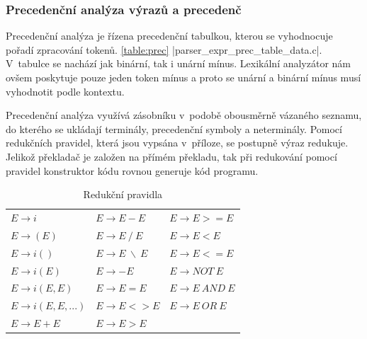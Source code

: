 \subsubsection{Precedenční analýza výrazů a precedenč}

Precedenční analýza je řízena precedenční tabulkou, kterou se vyhodnocuje pořadí zpracování tokenů. \ref{table:prec}
\ic|parser_expr_prec_table_data.c|. V~tabulce se nachází jak binární, tak i unární mínus.
Lexikální analyzátor nám ovšem poskytuje pouze jeden token mínus a proto se unární a binární mínus
musí vyhodnotit podle kontextu.

Precedenční analýza využívá zásobníku v~podobě obousměrně vázaného seznamu, do kterého se ukládají terminály,
precedenční symboly a neterminály. Pomocí redukčních pravidel, která jsou vypsána v~příloze, se postupně výraz redukuje.
Jelikož překladač je založen na přímém překladu, tak při redukování pomocí pravidel konstruktor kódu rovnou generuje kód programu.


\begin{table}[!htbp]
    \centering
    \label{Redukční pravidla}
    \caption{Redukční pravidla}
    \begin{tabular}{lll}
        $E \to i$ & $E \to E - E$ & $E \to E >= E$\\
        $E \to (E)$ & $E \to E ~ / ~ E$ & $E \to E < E$\\
        $E \to i()$ & $E \to E ~ \backslash ~ E$ & $E \to E <= E$\\
        $E \to i(E)$ & $E \to - E$ & $E \to NOT ~ E$\\
        $E \to i(E, E)$ & $E \to E = E$ & $E \to E ~ AND ~ E$\\
        $E \to i(E, E, ...)$ & $E \to E <> E$ & $E \to E ~ OR ~ E$\\
        $E \to E + E$ & $E \to E > E$\\
    \end{tabular}
\end{table}

